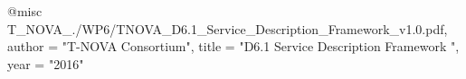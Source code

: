 @misc{ T_NOVA_./WP6/TNOVA_D6.1_Service_Description_Framework_v1.0.pdf,
       author = "T-NOVA Consortium",
       title = "D6.1 Service Description Framework ",
       year = "2016" }
